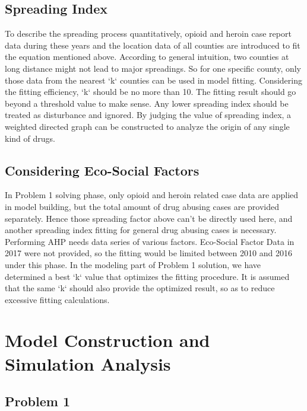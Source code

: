 \documentclass{mcmthesis}
\begin{document}
\subsection{Spreading Index}
To describe the spreading process quantitatively, opioid and heroin case report data during these years and the location data of all counties are introduced to fit the equation mentioned above. According to general intuition, two counties at long distance might not lead to major spreadings. So for one specific county, only those data from the nearest `k` counties can be used in model fitting. Considering the fitting efficiency, `k` should be no more than 10. The fitting result should go beyond a threshold value to make sense. Any lower spreading index should be treated as disturbance and ignored. By judging the value of spreading index, a weighted directed graph can be constructed to analyze the origin of any single kind of drugs.

\subsection{Considering Eco-Social Factors}
In Problem 1 solving phase, only opioid and heroin related case data are applied in model building, but the total amount of drug abusing cases are provided separately. Hence those spreading factor above can’t be directly used here, and another spreading index fitting for general drug abusing cases is necessary.
Performing AHP needs data series of various factors. Eco-Social Factor Data in 2017 were not provided, so the fitting would be limited between 2010 and 2016 under this phase.
In the modeling part of Problem 1 solution, we have determined a best `k` value that optimizes the fitting procedure. It is assumed that the same `k` should also provide the optimized result, so as to reduce excessive fitting calculations.


\section{Model Construction and Simulation Analysis}
\subsection{Problem 1}
\end{document}
